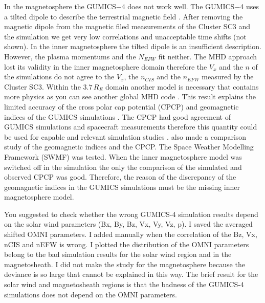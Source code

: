 \documentclass[linenumbers,draft]{agujournal}
\begin{document}
In the magnetosphere the GUMICS$-$4 does not work well. The GUMICS$-$4 uses a tilted dipole to describe the terrestrial magnetic field \citep{janhunen12:_gumic_mhd}. After removing the magnetic dipole from the magnetic filed measurements of the Cluster SC3 and the simulation we get very low correlations and unacceptable time shifts (not shown). In the inner magnetosphere the tilted dipole is an insufficient description. However, the plasma momentums and the $N_{EFW}$ fit neither. The MHD approach lost its validity in the inner magnetosphere domain therefore the $V_{x}$ and the $n$ of the simulations do not agree to the $V_{x}$, the $n_{CIS}$ and the $n_{EFW}$ measured by the Cluster SC3. Within the $3.7\,R_{E}$ domain another model is necessary that contains more physics as you can see another global MHD code \citep{lyon04:_lyon_fedder_mobar_lfm_mhd,raeder08:_openg_simul_themis_mission,powell99:_solut_adapt_upwin_schem_ideal_magnet,toth12:_adapt}. This result explains the limited accuracy of the cross polar cap potential (CPCP) and  geomagnetic indices of the GUMICS simulations \citep{juusola14:_statis_gumic_mhd}. The CPCP had good agreement of GUMICS simulations and spacecraft measurements therefore this quantity could be used for capable and relevant simulation studies \citep{lakka18:_cross_polar_cap_satur_gumic}. \citet{haiducek17:_swmf_global_magnet_simul_januar} also made a comparison study of the geomagnetic indices and the CPCP. The Space Weather Modelling Framework (SWMF) was tested. When the inner magnetosphere model was switched off in the simulation the only the comparison of the simulated and observed CPCP was good. Therefore, the reason of the discrepancy of the geomagnetic indices in the GUMICS simulations must be the missing inner magnetosphere model.


You suggested to check whether the wrong GUMICS-4 simulation results depend on the solar wind parameters (Bx, By, Bz, Vx, Vy, Vz, p). I saved the averaged shifted OMNI parameters. I added manually when the correlation of the Bz, Vx, nCIS and nEFW is wrong. I plotted the distribution of the OMNI parameters belong to the bad simulation results for the solar wind region and in the magnetosheath. I did not make the study for the magnetosphere because the deviance is so large that cannot be explained in this way. The brief result for the solar wind and magnetosheath regions is that the badness of the GUMICS-4 simulations does not depend on the OMNI parameters.
\end{document}
